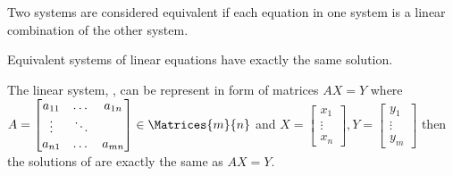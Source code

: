 \begin{definition}
    Two systems are considered equivalent if each equation in one system is a linear combination of the other system.
\end{definition}

\begin{proposition}
    Equivalent systems of linear equations have exactly the same solution.
\end{proposition}

The linear system, , can be represent in form of matrices \(AX = Y\) where \linebreak\({A = \begin{bmatrix}
            a_{11} & \dots  & a_{1n} \\
            \vdots & \ddots &        \\
            a_{n1} & \dots  & a_{mn}
        \end{bmatrix} \in \Matrices{m}{n}}\)
and \(X = \begin{bmatrix}
    x_1    \\
    \vdots \\
    x_n
\end{bmatrix} , Y = \begin{bmatrix}
    y_1    \\
    \vdots \\
    y_m
\end{bmatrix}\)
then the solutions of  are exactly the same as \(AX = Y\).
